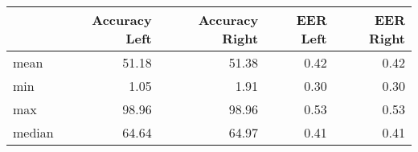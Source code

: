 \begin{tabular}{lrrrr}
\toprule
{} &  Accuracy Left &  Accuracy Right &  EER Left &  EER Right \\
\midrule
mean   &          51.18 &           51.38 &      0.42 &       0.42 \\
min    &           1.05 &            1.91 &      0.30 &       0.30 \\
max    &          98.96 &           98.96 &      0.53 &       0.53 \\
median &          64.64 &           64.97 &      0.41 &       0.41 \\
\bottomrule
\end{tabular}
